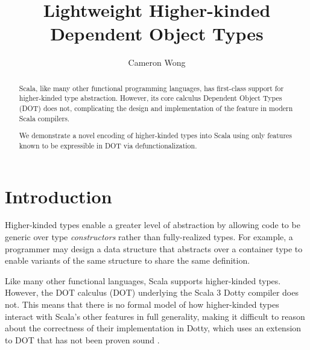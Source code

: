 \documentclass[acmsmall,screen]{acmart}
\begin{document}
\title{Lightweight Higher-kinded Dependent Object Types}

\author{Cameron Wong}

\renewcommand{\shortauthors}{Cameron Wong}

\renewcommand\footnotetextcopyrightpermission[1]{}
\pagestyle{fancy}
\fancyfoot{}
\makeatletter
\let\@authorsaddresses\@empty
\makeatother

\begin{abstract}
  Scala, like many other functional programming languages, has first-class
  support for higher-kinded type abstraction. However, its core calculus
  Dependent Object Types (DOT) does not, complicating the design and
  implementation of the feature in modern Scala compilers.

  We demonstrate a novel encoding of higher-kinded types into Scala using only
  features known to be expressible in DOT via defunctionalization.
\end{abstract}


\maketitle
\thispagestyle{firstfancy}

\section{Introduction}

Higher-kinded types enable a greater level of abstraction by allowing code to
be generic over type \emph{constructors} rather than fully-realized types. For
example, a programmer may design a data structure that abstracts over a
container type to enable variants of the same structure to share the same
definition.

Like many other functional languages, Scala supports higher-kinded types.
However, the DOT calculus (DOT) \cite{Amin_Grutter_Odersky_Rompf_Stucki_2016}
underlying the Scala 3 Dotty compiler does not. This means that there is no
formal model of how higher-kinded types interact with Scala's other features in
full generality, making it difficult to reason about the correctness of their
implementation in Dotty, which uses an extension to DOT that has not been
proven sound \cite{OderskyDotty}.
\end{document}
